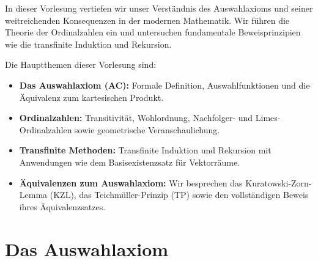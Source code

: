 


\begin{nice-box}
In dieser Vorlesung vertiefen wir unser Verständnis des Auswahlaxioms und seiner weitreichenden Konsequenzen in der modernen Mathematik. Wir führen die Theorie der Ordinalzahlen ein und untersuchen fundamentale Beweisprinzipien wie die transfinite Induktion und Rekursion.

Die Hauptthemen dieser Vorlesung sind:
\begin{itemize}
    \item \textbf{Das Auswahlaxiom (AC):} Formale Definition, Auswahlfunktionen und die Äquivalenz zum kartesischen Produkt.
    \item \textbf{Ordinalzahlen:} Transitivität, Wohlordnung, Nachfolger- und Limes-Ordinalzahlen sowie geometrische Veranschaulichung.
    \item \textbf{Transfinite Methoden:} Transfinite Induktion und Rekursion mit Anwendungen wie dem Basisexistenzsatz für Vektorräume.
    \item \textbf{Äquivalenzen zum Auswahlaxiom:} Wir besprechen das Kuratowski-Zorn-Lemma (KZL), das Teichmüller-Prinzip (TP) sowie den vollständigen Beweis ihres Äquivalenzsatzes.
\end{itemize}
\end{nice-box}

\section{Das Auswahlaxiom}
